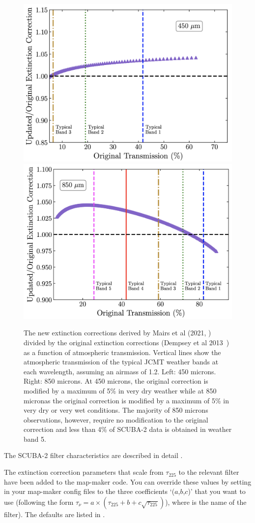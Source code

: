 \begin{figure}
\begin{center}
\includegraphics[width=0.4\linewidth]{sc21-NewExtCor-450} \hspace{0.02\linewidth}
\includegraphics[width=0.4\linewidth]{sc21-NewExtCor-850}
\caption[Updated Extinction Corrections]{The new extinction corrections 
derived by Mairs et al (2021, \cite{mairs21}) divided by the original extinction corrections (Dempsey et al 2013~\cite{dempsey12}) 
as a function of atmospheric transmission. Vertical lines show the atmospheric transmission of the typical JCMT 
weather bands at each wavelength, assuming an airmass of 1.2. Left: 450 microns. Right: 850 microns. At 450 microns, 
the original correction is modified by a maximum of 5\% in very dry weather while at 850 micronas the original correction is 
modified by a maximum of 5\% in very dry or very wet conditions. The majority of 850 microns observations, however, require no modification to the original correction and less than 4\% of SCUBA-2 data is obtained in weather band 5. \label{fig:NewExtCor}}
\end{center}
\end{figure}


The SCUBA-2 filter characteristics are described in detail
.

The extinction correction parameters that scale from $\tau_{225}$ to
the relevant filter have been added to the map-maker code. You can
override these values by setting  in
your map-maker config files to the three coefficients `($a$,$b$,$c$)' that
you want to use (following the form $\tau_{\nu} = a \times (\tau_{225} + b + c\sqrt{\tau_{225}})$), where  is the name of the
filter). The defaults are listed in
.



